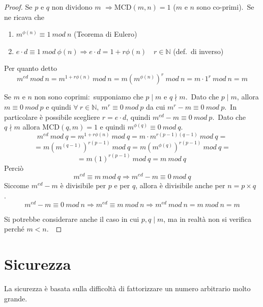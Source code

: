 \begin{proof}

    Se $p$ e $q$ non dividono $m$ $\Rightarrow \mathrm{MCD}(m, n) = 1$ ($m$ e $n$ sono co-primi).\
    Se ne ricava che
    \begin{enumerate}
        \item $m^{\phi(n)}\equiv 1\ \mathit{mod}\ n$ (Teorema di Eulero)
        \item $e \cdot d  \equiv 1\ \mathit{mod}\  \phi(n) \Rightarrow e \cdot d = 1 + r\phi(n)\quad r \in \mathbb{N}$ (def.\ di inverso)
    \end{enumerate}

    \noindent Per quanto detto
    \[m^{ed}\ \mathit{mod}\ n = m^{1+r \phi(n)}\ \mathit{mod}\ n = m \left(m^{\phi(n)}\right)^r\ \mathit{mod}\ n = m\cdot 1^r\ \mathit{mod}\ n = m \]

    Se $m$ e $n$ non sono coprimi:\ supponiamo che $p \mid m$ e $q \nmid m$.\
    Dato che $p \mid m$, allora  $m\equiv 0\ \mathit{mod}\ p$ e quindi $\forall\ r \in \mathbb{N},\ m^r \equiv 0\ \mathit{mod}\ p$ da cui $m^r - m\equiv 0\ \mathit{mod}\ p$.\
    In particolare è possibile scegliere $r = e\cdot d$, quindi $m^{ed} - m \equiv 0\ \mathit{mod}\ p$.\
    Dato che $q \nmid m$ allora $\mathrm{MCD}(q, m) = 1$ e quindi $m^{\phi(q)} \equiv 0\ \mathit{mod}\ q$.\
    \[m^{ed}\ \mathit{mod}\ q = m^{1+r\phi(n)}\ \mathit{mod}\ q = m \cdot m^{r(p-1)(q-1)}\ \mathit{mod}\ q =\]
    \[ = m \left( m^{(q-1)}\right)^{r(p-1)}\ \mathit{mod}\ q = m \left(m^{\phi(q)}\right)^{r(p-1)}\ \mathit{mod}\ q = \]
    \[ = m (1)^{r(p-1)}\ \mathit{mod}\ q = m\ \mathit{mod}\ q\ \]
    Perciò
    \[m^{ed} \equiv m\ \mathit{mod}\ q \Rightarrow m^{ed} - m \equiv 0\ \mathit{mod}\ q\]
    Siccome $m^{ed}-m$ è divisibile per $p$ e per $q$, allora è divisibile anche per $n = p \times q$.\
    \[m^{ed} - m \equiv 0\ \mathit{mod}\ n \Rightarrow m^{ed} \equiv m\ \mathit{mod}\ n \Rightarrow m^{ed}\ \mathit{mod}\ n = m\ \mathit{mod}\ n = m\]

    Si potrebbe considerare anche il caso in cui $p,q \mid m$, ma in realtà non si verifica perché $m<n$.\
\end{proof}

\section{Sicurezza}

La sicurezza è basata sulla difficoltà di fattorizzare un numero arbitrario molto grande.\

